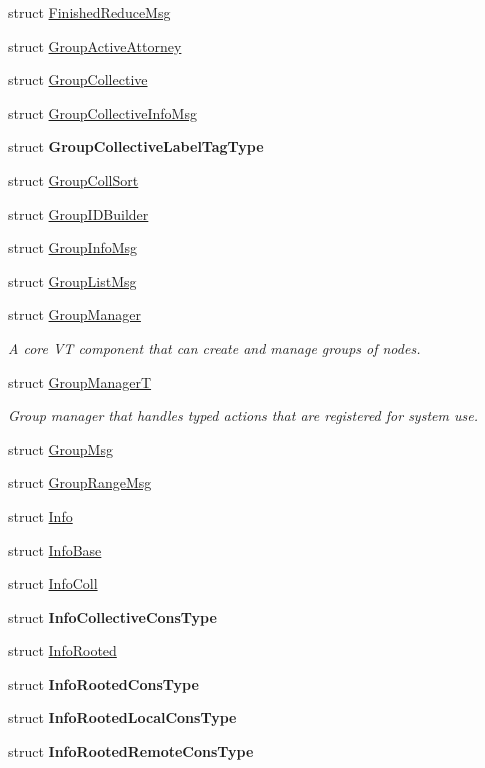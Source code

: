 \begin{DoxyCompactItemize}
\item 
struct \hyperlink{structvt_1_1group_1_1_finished_reduce_msg}{Finished\+Reduce\+Msg}
\item 
struct \hyperlink{structvt_1_1group_1_1_group_active_attorney}{Group\+Active\+Attorney}
\item 
struct \hyperlink{structvt_1_1group_1_1_group_collective}{Group\+Collective}
\item 
struct \hyperlink{structvt_1_1group_1_1_group_collective_info_msg}{Group\+Collective\+Info\+Msg}
\item 
struct {\bfseries Group\+Collective\+Label\+Tag\+Type}
\item 
struct \hyperlink{structvt_1_1group_1_1_group_coll_sort}{Group\+Coll\+Sort}
\item 
struct \hyperlink{structvt_1_1group_1_1_group_i_d_builder}{Group\+I\+D\+Builder}
\item 
struct \hyperlink{structvt_1_1group_1_1_group_info_msg}{Group\+Info\+Msg}
\item 
struct \hyperlink{structvt_1_1group_1_1_group_list_msg}{Group\+List\+Msg}
\item 
struct \hyperlink{structvt_1_1group_1_1_group_manager}{Group\+Manager}
\begin{DoxyCompactList}\small\item\em A core VT component that can create and manage groups of nodes. \end{DoxyCompactList}\item 
struct \hyperlink{structvt_1_1group_1_1_group_manager_t}{Group\+ManagerT}
\begin{DoxyCompactList}\small\item\em Group manager that handles typed actions that are registered for system use. \end{DoxyCompactList}\item 
struct \hyperlink{structvt_1_1group_1_1_group_msg}{Group\+Msg}
\item 
struct \hyperlink{structvt_1_1group_1_1_group_range_msg}{Group\+Range\+Msg}
\item 
struct \hyperlink{structvt_1_1group_1_1_info}{Info}
\item 
struct \hyperlink{structvt_1_1group_1_1_info_base}{Info\+Base}
\item 
struct \hyperlink{structvt_1_1group_1_1_info_coll}{Info\+Coll}
\item 
struct {\bfseries Info\+Collective\+Cons\+Type}
\item 
struct \hyperlink{structvt_1_1group_1_1_info_rooted}{Info\+Rooted}
\item 
struct {\bfseries Info\+Rooted\+Cons\+Type}
\item 
struct {\bfseries Info\+Rooted\+Local\+Cons\+Type}
\item 
struct {\bfseries Info\+Rooted\+Remote\+Cons\+Type}
\end{DoxyCompactItemize}
